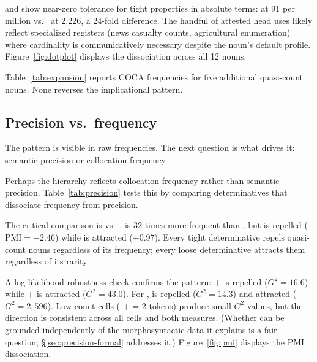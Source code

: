 \documentclass[12pt,a4paper]{article}
\begin{document}
 and  show near-zero tolerance for tight properties in absolute terms:  at 91 per million vs.\  at 2{,}226, a 24-fold difference. The handful of attested head uses likely reflect specialized registers (news casualty counts, agricultural enumeration) where cardinality is communicatively necessary despite the noun's default profile. Figure~\ref{fig:dotplot} displays the dissociation across all 12 nouns.



Table~\ref{tab:expansion} reports COCA frequencies for five additional quasi-count nouns. None reverses the implicational pattern.



\subsection{Precision vs.\ frequency}\label{sec:precision}

The pattern is visible in raw frequencies. The next question is what drives it: semantic precision or collocation frequency.

Perhaps the hierarchy reflects collocation frequency rather than semantic precision. Table~\ref{tab:precision} tests this by comparing determinatives that dissociate frequency from precision.



The critical comparison is  vs.\ .  is 32 times more frequent than , but  is repelled ($\text{PMI} = -2.46$) while  is attracted ($+0.97$). Every tight determinative repels quasi-count nouns regardless of its frequency; every loose determinative attracts them regardless of its rarity.

A log-likelihood robustness check confirms the pattern:  +  is repelled ($G^2 = 16.6$) while  +  is attracted ($G^2 = 43.0$). For ,  is repelled ($G^2 = 14.3$) and  attracted ($G^2 = 2{,}596$). Low-count cells ( +  = 2 tokens) produce small $G^2$ values, but the direction is consistent across all cells and both measures. (Whether  can be grounded independently of the morphosyntactic data it explains is a fair question; \S\ref{sec:precision-formal} addresses it.) Figure~\ref{fig:pmi} displays the PMI dissociation.
\end{document}
